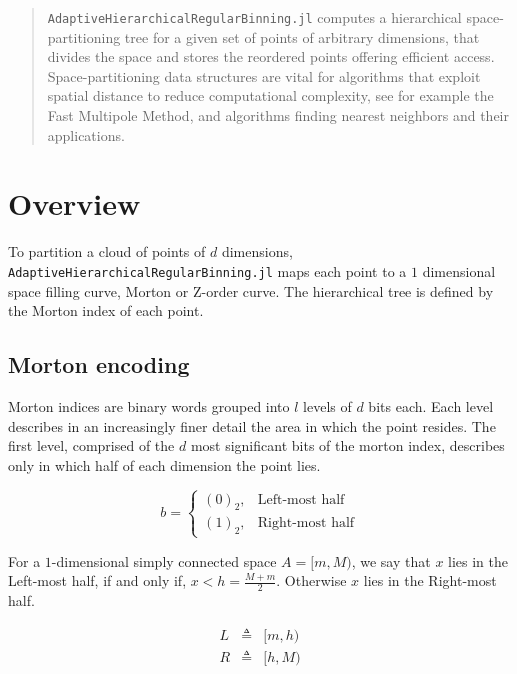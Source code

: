 \documentclass{juliacon}
\begin{document}


\maketitle

\begin{abstract}

\verb|AdaptiveHierarchicalRegularBinning.jl| computes a hierarchical space-partitioning
tree for a given set of points of arbitrary dimensions, that divides the space and
stores the reordered points offering efficient access. Space-partitioning data
structures are vital for algorithms that exploit spatial distance to reduce
computational complexity, see for example the Fast Multipole Method, and algorithms
finding nearest neighbors and their applications.

\end{abstract}

\section{Overview}
To partition a cloud of points of $d$ dimensions,
\verb|AdaptiveHierarchicalRegularBinning.jl| maps each point to a $1$ dimensional
space filling curve, Morton or Z-order curve. The hierarchical tree is defined by the
Morton index of each point.



\subsection{Morton encoding}
Morton indices are binary words grouped into $l$ levels of $d$ bits each. Each level
describes in an increasingly finer detail the area in which the point resides. The
first level, comprised of the $d$ most significant bits of the morton index, describes
only in which half of each dimension the point lies.

$$b = \left\{\begin{matrix}
  (0)_2, & \textrm{Left-most half}  \\
  (1)_2, & \textrm{Right-most half}
\end{matrix}\right.$$


\begin{definition}
  For a $1$-dimensional simply connected space $A = [m, M)$, we say that
  $x$ lies in the Left-most half, if and only if, $x<h=\frac{M+m}{2}$.
  Otherwise $x$ lies in the Right-most half.

  $$
  \begin{matrix}
    L &\triangleq& [m, h) \\
    R &\triangleq& [h, M)
  \end{matrix}
  $$
\end{definition}
\end{document}
